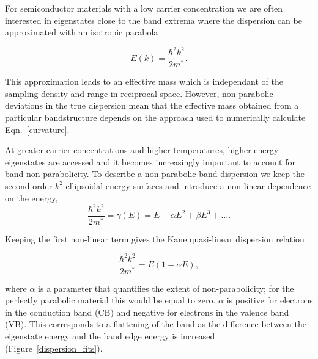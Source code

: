 For semiconductor materials with a low carrier concentration we are often interested in eigenstates close to the band extrema where the dispersion can be approximated with an isotropic parabola

\begin{equation} \label{parabolic}
E(k)= \frac{\hbar^2k^2}{2m^*}.
\end{equation}

This approximation leads to an effective mass which is independant of the sampling density and range in reciprocal space.
However, non-parabolic deviations in the true dispersion mean that the effective mass obtained from a particular bandstructure depends on the approach used to numerically calculate Eqn.\ \ref{curvature}. 

At greater carrier concentrations and higher temperatures, higher energy eigenstates are accessed and it becomes increasingly important to account for band non-parabolicity.\autocite{Ruf1990} 
To describe a non-parabolic band dispersion we keep the second order $k^2$ ellipsoidal energy surfaces and introduce a non-linear dependence on the energy, 
\begin{equation} \label{nonparabolic}
\frac{\hbar^2k^2}{2m^*} = \gamma(E) = E + \alpha E^2 + \beta E^3+ \ldots .
\end{equation}

Keeping the first non-linear term gives the Kane quasi-linear dispersion relation\autocite{Kane1957}

\begin{equation} \label{kane}
\frac{\hbar^2k^2}{2m^*} = E(1 + \alpha E),
\end{equation}

where $\alpha$ is a parameter that quantifies the extent of non-parabolicity; for the perfectly parabolic material this would be equal to zero. 
$\alpha$ is positive for electrons in the conduction band (CB) and negative for electrons in the valence band (VB). 
This corresponds to a flattening of the band as the difference between the eigenstate energy and the band edge energy is increased (Figure\ \ref{dispersion_fits}).

